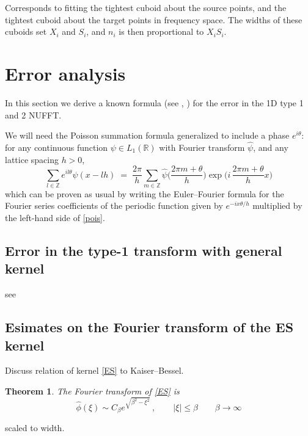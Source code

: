 \documentclass[10pt]{article}
\newcommand{\be}{\begin{equation}}
\newcommand{\ee}{\end{equation}}
\newcommand{\RR}{\mathbb{R}}
\newcommand{\ZZ}{\mathbb{Z}}
\newtheorem{thm}{Theorem}
\newcommand{\KB}{Kaiser--Bessel}
\newcommand{\freq}{\beta}          %
\begin{document}
Corresponds to fitting the tightest cuboid about the source points,
and the tightest cuboid about the target points in 
frequency space.
The widths of these cuboids set $X_i$ and $S_i$,
and $n_i$ is then proportional to $X_iS_i$.




\section{Error analysis}

In this section we derive a known formula
(see \cite{fourmont,nfft}, \cite[Sec.~V.B]{fessler})
for the error in the 1D type 1 and 2 NUFFT.

We will need the
Poisson summation formula
\cite{apostol} generalized to include a phase $e^{i\theta}$:
for any continuous function
$\psi \in L_1(\RR)$ with Fourier transform $\hat\psi$,
and any lattice spacing $h>0$,
\be
\sum_{l\in\ZZ} e^{il\theta} \psi(x - lh) \; = \;
\frac{2\pi}{h} \sum_{m\in\ZZ}
\hat\psi\biggl(\frac{2\pi m + \theta}{h}\biggr)
\exp \biggl({i\,\frac{2\pi m + \theta}{h}x}\biggr)
\label{pois}
\ee
which can be proven as usual by writing the Euler--Fourier
formula for the Fourier series coefficients
of the periodic function given by $e^{-ix\theta/h}$
multiplied by the left-hand side of \eqref{pois}.


\subsection{Error in the type-1 transform with general kernel}
\label{s:err}



see 




\subsection{Esimates on the Fourier transform of the ES kernel}

Discuss relation of kernel \eqref{ES} to \KB.


\begin{thm} %
  
The Fourier transform of \eqref{ES} is
\be
\hat\phi(\xi) \sim C_\freq e^{\sqrt{\freq^2-\xi^2}}
~, \qquad |\xi| \le \freq
\qquad  \freq\to\infty
\label{EShat}
\ee

\end{thm} %


scaled to width.
\end{document}
